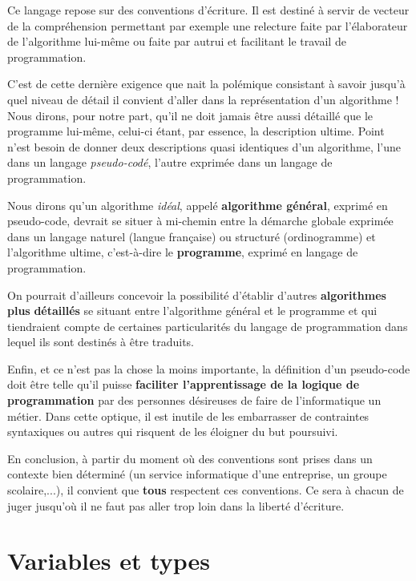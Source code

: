 		Ce langage repose sur des conventions d’écriture. Il est destiné à
		servir de vecteur de la compréhension permettant par exemple une
		relecture faite par l’élaborateur de l’algorithme lui-même ou faite par
		autrui et facilitant le travail de programmation.

		C’est de cette dernière exigence que nait la polémique consistant à
		savoir jusqu’à quel niveau de détail il convient d’aller dans la
		représentation d’un algorithme ! Nous dirons, pour notre part, qu’il ne
		doit jamais être aussi détaillé que le programme lui-même, celui-ci
		étant, par essence, la description ultime. Point n’est besoin de donner
		deux descriptions quasi identiques d’un algorithme, l’une dans un
		langage \textit{pseudo-codé}, l’autre exprimée dans un langage de
		programmation.

		Nous dirons qu’un algorithme \textit{idéal}, appelé \textbf{algorithme
		général}, exprimé en pseudo-code, devrait se situer à mi-chemin entre
		la démarche globale exprimée dans un langage naturel (langue française)
		ou structuré (ordinogramme) et l’algorithme ultime, c’est-à-dire le
		\textbf{programme}, exprimé en langage de programmation.

		On pourrait d’ailleurs concevoir la possibilité d’établir d’autres
		\textbf{algorithmes plus }\textbf{détaillés} se situant entre
		l’algorithme général et le programme et qui tiendraient compte de
		certaines particularités du langage de programmation dans lequel ils
		sont destinés à être traduits.

		Enfin, et ce n’est pas la chose la moins importante, la définition d’un
		pseudo-code doit être telle qu’il puisse \textbf{faciliter
		l’apprentissage de la logique de programmation} par des personnes
		désireuses de faire de l’informatique un métier. Dans cette optique, il
		est inutile de les embarrasser de contraintes syntaxiques ou autres qui
		risquent de les éloigner du but poursuivi.

		En conclusion, à partir du moment où des conventions sont prises dans un
		contexte bien déterminé (un service informatique d’une entreprise, un
		groupe scolaire,...), il convient que \textbf{tous }respectent ces
		conventions. Ce sera à chacun de juger jusqu’où il ne faut pas aller
		trop loin dans la liberté d’écriture.

	\section{Variables et types}

